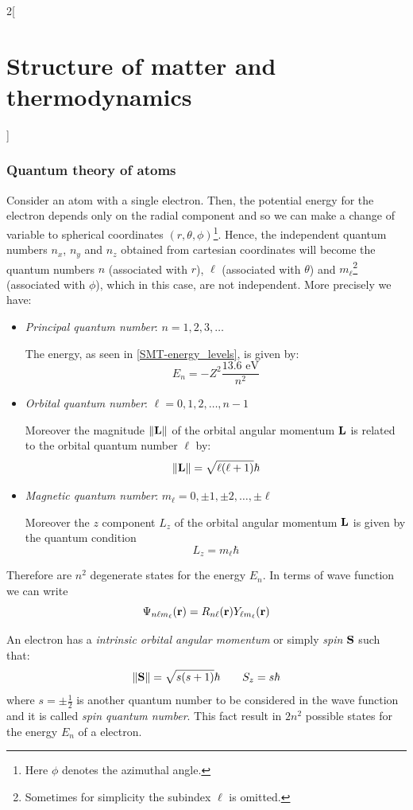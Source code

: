 \documentclass[../../../main.tex]{subfiles}
\begin{document}
\begin{multicols}{2}[\section{Structure of matter and thermodynamics}]
  \subsubsection*{Quantum theory of atoms}
  \begin{definition}
    Consider an atom with a single electron. Then, the potential energy for the electron depends only on the radial component and so we can make a change of variable to spherical coordinates $(r,\theta,\phi)$\footnote{Here $\phi$ denotes the azimuthal angle.}. Hence, the independent quantum numbers $n_x$, $n_y$ and $n_z$ obtained from cartesian coordinates will become the quantum numbers $n$ (associated with $r$), $\ell$ (associated with $\theta$) and $m_\ell$\footnote{Sometimes for simplicity the subindex $\ell$ is omitted.} (associated with $\phi$), which in this case, are not independent. More precisely we have:
    \begin{itemize}
      \item \textit{Principal quantum number}: $n=1,2,3,\ldots$\par
            The energy, as seen in \eqref{SMT-energy_levels}, is given by: $$E_n=-Z^2\frac{13.6\text{ eV}}{n^2}$$
      \item \textit{Orbital quantum number}: $\ell=0,1,2,\ldots,n-1$\par Moreover the magnitude $\|\vb{L}\|$ of the orbital angular momentum $\vb{L}$ is related to the orbital quantum number $\ell$ by: $$\|\vb{L}\|=\sqrt{\ell(\ell+1)}\hbar$$
      \item \textit{Magnetic quantum number}: $m_\ell=0,\pm 1,\pm 2,\ldots,\pm\ell$\par
            Moreover the $z$ component $L_z$ of the orbital angular momentum $\vb{L}$ is given by the quantum condition $$L_z=m_\ell\hbar$$
    \end{itemize}
    Therefore are $n^2$ degenerate states for the energy $E_n$.
    In terms of wave function we can write $$\Psi_{n\ell m_\ell}(\vb{r})=R_{n\ell}(\vb{r})Y_{\ell m_\ell}(\vb{r})$$
  \end{definition}
  \begin{definition}[Spin]
    An electron has a \textit{intrinsic orbital angular momentum} or simply \textit{spin $\vb{S}$} such that:
    $$\|\vb{S}\|=\sqrt{s(s+1)}\hbar\qquad S_z=s\hbar$$ where $s=\pm\frac{1}{2}$ is another quantum number  to be considered in the wave function and it is called \textit{spin quantum number}. This fact result in $2n^2$ possible states for the energy $E_n$ of a electron.

\end{definition}
\end{multicols}
\end{document}
